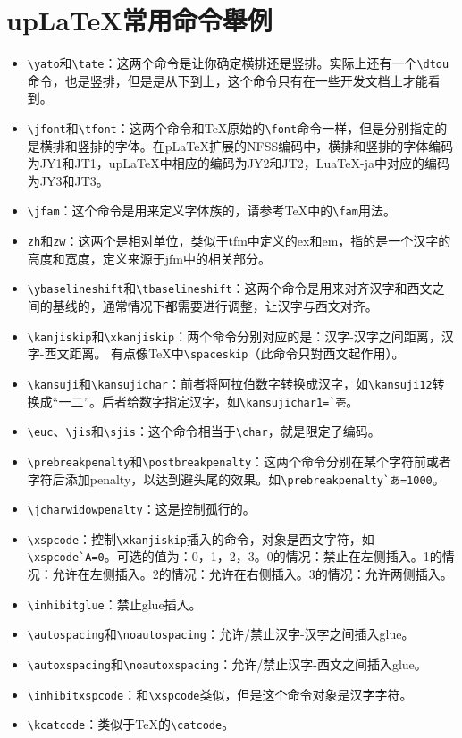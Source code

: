 
\section{up{\LaTeX}常用命令舉例}

\begin{itemize}
\item{}{\verb+\yato+}和{\verb+\tate+}：这两个命令是让你确定横排还是竖排。实际上还有一个{\verb+\dtou+}命令，也是竖排，但是是从下到上，这个命令只有在一些开发文档上才能看到。
\item{}{\verb+\jfont+}和{\verb+\tfont+}：这两个命令和TeX原始的{\verb+\font+}命令一样，但是分别指定的是横排和竖排的字体。在{p\LaTeX}扩展的NFSS编码中，横排和竖排的字体编码为JY1和JT1，{up\LaTeX}中相应的编码为JY2和JT2，{Lua\TeX}-ja中对应的编码为JY3和JT3。
\item{}{\verb+\jfam+}：这个命令是用来定义字体族的，请参考{\TeX}中的{\verb+\fam+}用法。
\item{}{\verb+zh+}和{\verb+zw+}：这两个是相对单位，类似于tfm中定义的ex和em，指的是一个汉字的高度和宽度，定义来源于jfm中的相关部分。
\item{}{\verb+\ybaselineshift+}和{\verb+\tbaselineshift+}：这两个命令是用来对齐汉字和西文之间的基线的，通常情况下都需要进行调整，让汉字与西文对齐。
\item{}{\verb+\kanjiskip+}和{\verb+\xkanjiskip+}：两个命令分别对应的是：汉字-汉字之间距离，汉字-西文距离。 有点像{\TeX}中{\verb+\spaceskip+}（此命令只對西文起作用）。
\item{}{\verb+\kansuji+}和{\verb+\kansujichar+}：前者将阿拉伯数字转换成汉字，如{\verb+\kansuji12+}转换成“一二”。后者给数字指定汉字，如{\verb+\kansujichar1=`壱+}。
\item{}{\verb+\euc+}、{\verb+\jis+}和{\verb+\sjis+}：这个命令相当于{\verb+\char+}，就是限定了编码。
\item{}{\verb+\prebreakpenalty+}和{\verb+\postbreakpenalty+}：这两个命令分别在某个字符前或者字符后添加penalty，以达到避头尾的效果。如{\verb+\prebreakpenalty`あ=1000+}。
\item{}{\verb+\jcharwidowpenalty+}：这是控制孤行的。
\item{}{\verb+\xspcode+}：控制{\verb+\xkanjiskip+}插入的命令，对象是西文字符，如{\verb+\xspcode`A=0+}。可选的值为：0，1，2，3。0的情况：禁止在左侧插入。1的情况：允许在左侧插入。2的情况：允许在右侧插入。3的情况：允许两侧插入。
\item{}{\verb+\inhibitglue+}：禁止glue插入。
\item{}{\verb+\autospacing+}和{\verb+\noautospacing+}：允许/禁止汉字-汉字之间插入glue。
\item{}{\verb+\autoxspacing+}和{\verb+\noautoxspacing+}：允许/禁止汉字-西文之间插入glue。
\item{}{\verb+\inhibitxspcode+}：和{\verb+\xspcode+}类似，但是这个命令对象是汉字字符。
\item{}{\verb+\kcatcode+}：类似于TeX的{\verb+\catcode+}。
\end{itemize}

